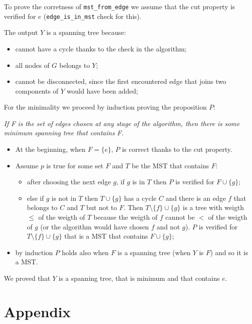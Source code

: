 \documentclass[paper=a4, fontsize=11pt]{scrartcl} %
\numberwithin{equation}{section} %
\numberwithin{figure}{section} %
\numberwithin{table}{section} %
\begin{document}
To prove the corretness of \verb|mst_from_edge| we assume that the cut property is verified for $e$ (\verb|edge_is_in_mst| check for this).

The output $Y$ is a spanning tree because:
\begin{itemize}
    \item cannot have a cycle thanks to the check in the algorithm;
    \item all nodes of $G$ belongs to $Y$;
    \item cannot be disconnected, since the first encountered edge that joins two components of $Y$ would have been added;
\end{itemize}

For the minimality we proceed by induction proving the proposition $P$:

\bigskip
{\em If F is the set of edges chosen at any stage of the algorithm, then there is some minimum spanning tree that contains F.}
\bigskip

\begin{itemize}
    \item At the beginning, when $F = \{e\}$, $P$ is correct thanks to the cut property.
    \item Assume $p$ is true for some set $F$ and $T$ be the MST that contains $F$:
    \begin{itemize}
        \item after choosing the next edge $g$, if $g$ is in $T$ then $P$ is verified for $F \cup \{g\}$;
        \item else if $g$ is not in $T$ then $T \cup \{g\}$ has a cycle $C$ and there is an edge $f$ that belongs to $C$ and $T$ but not to $F$. Then $T \setminus \{f\} \cup \{g\}$ is a tree with weigth $\leq$ of the weigth of $T$ because the weigth of $f$ cannot be $<$ of the weigth of $g$ (or the algorithm would have chosen $f$ and not $g$). $P$ is verified for $T \setminus \{f\} \cup \{g\}$ that is a MST that contains $F \cup \{g\}$; 
    \end{itemize}
    \item by induction $P$ holds also when $F$ is a spanning tree (when $Y$ is $F$) and so it is a MST.
\end{itemize}

We proved that $Y$ is a spanning tree, that is minimum and that contains $e$.

\newpage

\section*{Appendix}
\end{document}

